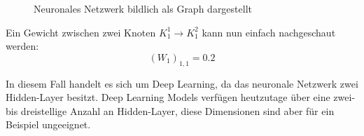\documentclass[12pt,letterpaper,ngerman]{article}
\begin{document}
\begin{example}
\begin{figure}[H]
\begin{center}
      \caption{ Neuronales Netzwerk bildlich als Graph dargestellt}
    \end{center}
  \end{figure}
  Ein Gewicht zwischen zwei Knoten $K_1^1 \to K_1^2$ kann nun einfach nachgeschaut werden:
  \[
    (W_1)_{1,1} = 0.2
  \]
\end{example}
In diesem Fall handelt es sich um Deep Learning, da das neuronale Netzwerk 
zwei Hidden-Layer besitzt. Deep Learning Models verfügen heutzutage über
eine zwei- bis dreistellige Anzahl an Hidden-Layer, diese Dimensionen sind 
aber für ein Beispiel ungeeignet.
\end{document}
